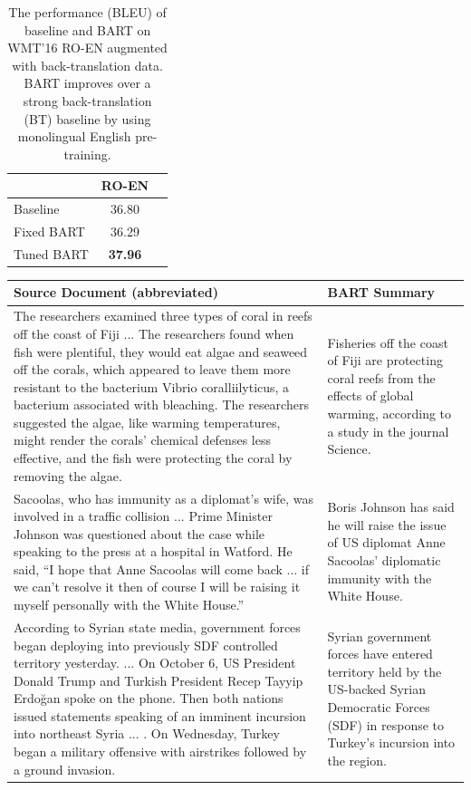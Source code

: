 \documentclass{article} %
\begin{document}
\begin{table}[t]
\centering
\begin{tabular}{lcc}
\toprule
&  RO-EN	 \\
\midrule
Baseline& 36.80\\
Fixed BART & 36.29\\
Tuned BART & \textbf{37.96}\\
\bottomrule
\end{tabular}
\caption{The performance (BLEU) of baseline and BART on WMT'16 RO-EN augmented with back-translation data. BART improves over a strong back-translation (BT) baseline by using monolingual English pre-training.}
\label{tab:MT_results}
\end{table}
\begin{table}[ht]
\centering
\begin{tabular}{p{9cm}p{6cm}}
\toprule
\textbf{Source Document (abbreviated)}   & \textbf{BART Summary} \\
\midrule
The researchers examined three types of coral in reefs off the coast of Fiji ... The researchers found when fish were plentiful, they would eat algae and seaweed off the corals, which appeared to leave them more resistant to the bacterium Vibrio coralliilyticus, a bacterium associated with bleaching. The researchers suggested the algae, like warming temperatures, might render the corals' chemical defenses less effective, and the fish were protecting the coral by removing the algae. & Fisheries off the coast of Fiji are protecting coral reefs from the effects of global warming, according to a study in the journal Science.\\
\midrule
Sacoolas, who has immunity as a diplomat's wife, was involved in a traffic collision ... Prime Minister Johnson was questioned about the case while speaking to the press at a hospital in Watford. He said, ``I hope that Anne Sacoolas will come back ... if we can't resolve it then of course I will be raising it myself personally with the White House.'' & Boris Johnson has said he will raise the issue of US diplomat Anne Sacoolas' diplomatic immunity with the White House. \\
\midrule
According to Syrian state media, government forces began deploying into previously SDF controlled territory yesterday. ... On October 6, US President Donald Trump and Turkish President Recep Tayyip Erdoğan spoke on the phone. Then both nations issued statements speaking of an imminent incursion into northeast Syria ... . On Wednesday, Turkey began a military offensive with airstrikes followed by a ground invasion. & Syrian government forces have entered territory held by the US-backed Syrian Democratic Forces (SDF) in response to Turkey's incursion into the region. \\

\end{tabular}
\end{table}
\end{document}
